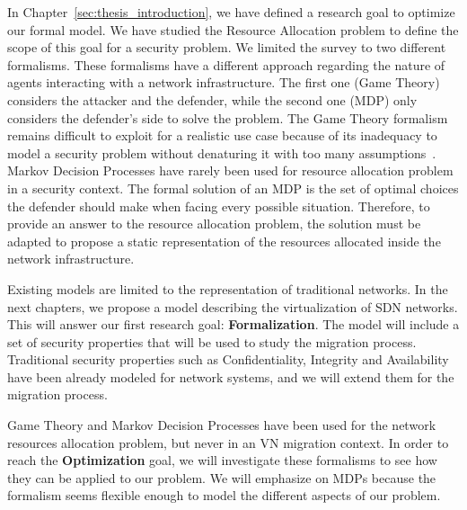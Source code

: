 In Chapter~\ref{sec:thesis_introduction}, we have defined a research goal to optimize our formal model. 
We have studied the Resource Allocation problem to define the scope of this goal for a security problem.
We limited the survey to two different formalisms. These formalisms have a different approach regarding the nature of agents interacting with a network infrastructure. The first one (\ie Game Theory) considers the attacker and the defender, while the second one (\ie MDP) only considers the defender's side to solve the problem.
The Game Theory formalism remains difficult to exploit for a realistic use case because of its inadequacy to model a security problem without denaturing it with too many assumptions~\cite{Kiennert2018}.
Markov Decision Processes have rarely been used for resource allocation problem in a security context. The formal solution of an MDP is the set of optimal choices the defender should make when facing every possible situation. Therefore, to provide an answer to the resource allocation problem, the solution must be adapted to propose a static representation of the resources allocated inside the network infrastructure.

Existing models are limited to the representation of traditional networks.
In the next chapters, we propose a model describing the virtualization of SDN networks. This will answer our first research goal: \textbf{Formalization}. The model will include a set of security properties that will be used to study the migration process. Traditional security properties such as Confidentiality, Integrity and Availability have been already modeled for network systems, and we will extend them for the migration process.

Game Theory and Markov Decision Processes have been used for the network resources allocation problem, but never in an VN migration context. In order to reach the \textbf{Optimization} goal, we will investigate these formalisms to see how they can be applied to our problem. We will emphasize on MDPs because the formalism seems flexible enough to model the different aspects of our problem.


